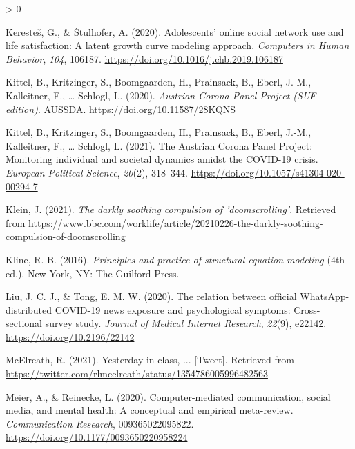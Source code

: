 \documentclass[
  english,
  man,mask,floatsintext]{apa6}
\newlength{\cslhangindent}
\newenvironment{CSLReferences}[2] %
 {%
  \setlength{\parindent}{0pt}
  \ifodd #1 \everypar{\setlength{\hangindent}{\cslhangindent}}\ignorespaces\fi
  \ifnum #2 > 0
  \setlength{\parskip}{#2\baselineskip}
  \fi
 }%
 {}
\begin{document}
\begin{CSLReferences}{1}{0}
\leavevmode\hypertarget{ref-kerestesAdolescentsOnlineSocial2020}{}%
Keresteš, G., \& Štulhofer, A. (2020). Adolescents' online social network use and life satisfaction: {A} latent growth curve modeling approach. \emph{Computers in Human Behavior}, \emph{104}, 106187. \url{https://doi.org/10.1016/j.chb.2019.106187}

\leavevmode\hypertarget{ref-kittelAustrianCoronaPanel2020}{}%
Kittel, B., Kritzinger, S., Boomgaarden, H., Prainsack, B., Eberl, J.-M., Kalleitner, F., \ldots{} Schlogl, L. (2020). \emph{Austrian {Corona} {Panel} {Project} ({SUF} edition)}. AUSSDA. \url{https://doi.org/10.11587/28KQNS}

\leavevmode\hypertarget{ref-kittelAustrianCoronaPanel2021}{}%
Kittel, B., Kritzinger, S., Boomgaarden, H., Prainsack, B., Eberl, J.-M., Kalleitner, F., \ldots{} Schlogl, L. (2021). The {Austrian} {Corona} {Panel} {Project}: Monitoring individual and societal dynamics amidst the {COVID}-19 crisis. \emph{European Political Science}, \emph{20}(2), 318--344. \url{https://doi.org/10.1057/s41304-020-00294-7}

\leavevmode\hypertarget{ref-kleinDarklySoothingCompulsion2021}{}%
Klein, J. (2021). \emph{The darkly soothing compulsion of 'doomscrolling'}. Retrieved from \url{https://www.bbc.com/worklife/article/20210226-the-darkly-soothing-compulsion-of-doomscrolling}

\leavevmode\hypertarget{ref-klinePrinciplesPracticeStructural2016}{}%
Kline, R. B. (2016). \emph{Principles and practice of structural equation modeling} (4th ed.). New York, NY: The Guilford Press.

\leavevmode\hypertarget{ref-liuRelationOfficialWhatsAppdistributed2020}{}%
Liu, J. C. J., \& Tong, E. M. W. (2020). The relation between official {WhatsApp}-distributed {COVID}-19 news exposure and psychological symptoms: Cross-sectional survey study. \emph{Journal of Medical Internet Research}, \emph{22}(9), e22142. \url{https://doi.org/10.2196/22142}

\leavevmode\hypertarget{ref-mcelreathYesterdayClass2021}{}%
McElreath, R. (2021). Yesterday in class, ... {[}Tweet{]}. Retrieved from \url{https://twitter.com/rlmcelreath/status/1354786005996482563}

\leavevmode\hypertarget{ref-meierComputermediatedCommunicationSocial2020a}{}%
Meier, A., \& Reinecke, L. (2020). Computer-mediated communication, social media, and mental health: {A} conceptual and empirical meta-review. \emph{Communication Research}, 009365022095822. \url{https://doi.org/10.1177/0093650220958224}


\end{CSLReferences}
\end{document}
